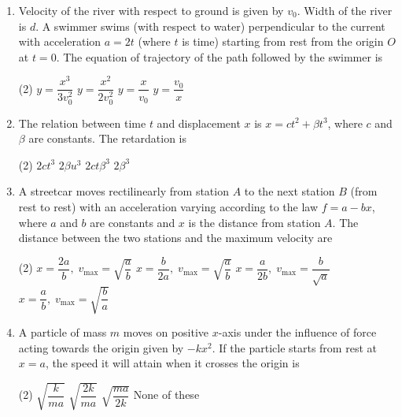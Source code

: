 \documentclass{article}
\renewcommand{\frac}[2]{\dfrac{#1}{#2}}
\begin{document}
\begin{enumerate}
    \item Velocity of the river with respect to ground is given by \( v_0 \). Width of the river is \( d \). A swimmer swims (with respect to water) perpendicular to the current with acceleration \( a = 2t \) (where \( t \) is time) starting from rest from the origin \( O \) at \( t = 0 \). The equation of trajectory of the path followed by the swimmer is
    \begin{tasks}(2)
        \task \( y = \frac{x^3}{3v_0^2} \)
        \task \( y = \frac{x^2}{2v_0^2} \)
        \task \( y = \frac{x}{v_0} \)
        \task \( y = \frac{v_0}{x} \)
    \end{tasks}

    \item The relation between time \( t \) and displacement \( x \) is \( x = ct^2 + \beta t^3 \), where \( c \) and \( \beta \) are constants. The retardation is
    \begin{tasks}(2)
        \task \( 2 ct^3 \)
        \task \( 2 \beta u^3 \)
        \task \( 2 ct\beta^3 \)
        \task \( 2 \beta^3 \)
    \end{tasks}

    \item A streetcar moves rectilinearly from station \( A \) to the next station \( B \) (from rest to rest) with an acceleration varying according to the law \( f = a - bx \), where \( a \) and \( b \) are constants and \( x \) is the distance from station \( A \). The distance between the two stations and the maximum velocity are
    \begin{tasks}(2)
        \task \( x = \frac{2a}{b}, \; v_{\text{max}} = \sqrt{\frac{a}{b}} \)
        \task \( x = \frac{b}{2a}, \; v_{\text{max}} = \sqrt{\frac{a}{b}} \)
        \task \( x = \frac{a}{2b}, \; v_{\text{max}} = \frac{b}{\sqrt{a}} \)
        \task \( x = \frac{a}{b}, \; v_{\text{max}} = \sqrt{\frac{b}{a}} \)
    \end{tasks}

    \item A particle of mass \( m \) moves on positive \( x \)-axis under the influence of force acting towards the origin given by \( -kx^2 \). If the particle starts from rest at \( x = a \), the speed it will attain when it crosses the origin is
    \begin{tasks}(2)
        \task \( \sqrt{\frac{k}{ma}} \)
        \task \( \sqrt{\frac{2k}{ma}} \)
        \task \( \sqrt{\frac{ma}{2k}} \)
        \task None of these
    \end{tasks}


\end{enumerate}
\end{document}
